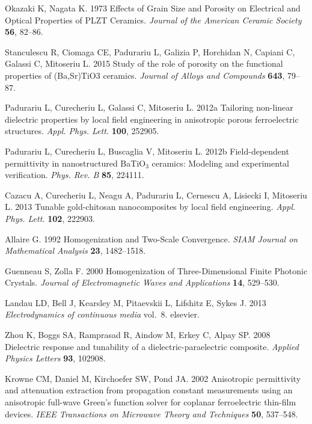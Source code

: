 \documentclass[aps,prb,11pt]{revtex4-1}
\begin{document}
\begin{thebibliography}{99}
Okazaki K, Nagata K. 1973  Effects of {Grain} {Size} and {Porosity} on
  {Electrical} and {Optical} {Properties} of {PLZT} {Ceramics}. {\em Journal of
  the American Ceramic Society} \textbf{56}, 82--86.

Stanculescu R, Ciomaga CE, Padurariu L, Galizia P, Horchidan N, Capiani C,
  Galassi C, Mitoseriu L. 2015  Study of the role of porosity on the functional
  properties of ({Ba},{Sr}){TiO}3 ceramics. {\em Journal of Alloys and
  Compounds} \textbf{643}, 79--87.

Padurariu L, Curecheriu L, Galassi C, Mitoseriu L. 2012a  Tailoring non-linear
  dielectric properties by local field engineering in anisotropic porous
  ferroelectric structures. {\em Appl. Phys. Lett.} \textbf{100}, 252905.

Padurariu L, Curecheriu L, Buscaglia V, Mitoseriu L. 2012b  Field-dependent
  permittivity in nanostructured {BaTiO}$_3$ ceramics: {Modeling} and
  experimental verification. {\em Phys. Rev. B} \textbf{85}, 224111.

Cazacu A, Curecheriu L, Neagu A, Padurariu L, Cernescu A, Lisiecki I, Mitoseriu
  L. 2013  Tunable gold-chitosan nanocomposites by local field engineering.
  {\em Appl. Phys. Lett.} \textbf{102}, 222903.

Allaire G. 1992  Homogenization and {Two}-{Scale} {Convergence}. {\em SIAM
  Journal on Mathematical Analysis} \textbf{23}, 1482--1518.

Guenneau S, Zolla F. 2000  Homogenization of {Three}-{Dimensional} {Finite}
  {Photonic} {Crystals}. {\em Journal of Electromagnetic Waves and
  Applications} \textbf{14}, 529--530.

Landau LD, Bell J, Kearsley M, Pitaevskii L, Lifshitz E, Sykes J. 2013 {\em
  Electrodynamics of continuous media} vol.~8.
elsevier.

Zhou K, Boggs SA, Ramprasad R, Aindow M, Erkey C, Alpay SP. 2008  Dielectric
  response and tunability of a dielectric-paraelectric composite. {\em Applied
  Physics Letters} \textbf{93}, 102908.

Krowne CM, Daniel M, Kirchoefer SW, Pond JA. 2002  Anisotropic permittivity and
  attenuation extraction from propagation constant measurements using an
  anisotropic full-wave {Green}'s function solver for coplanar ferroelectric
  thin-film devices. {\em IEEE Transactions on Microwave Theory and Techniques}
  \textbf{50}, 537--548.


\end{thebibliography}
\end{document}
